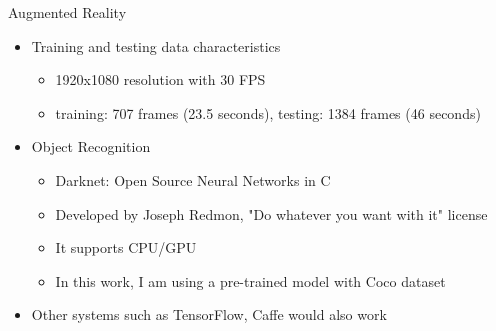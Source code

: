 \begin{frame}{Augmented Reality}
  \begin{itemize}
  \item Training and testing data characteristics
    \begin{itemize}
    \item 1920x1080 resolution with 30 FPS
    \item training: 707 frames (23.5 seconds), testing: 1384 frames (46 seconds)
    \end{itemize}
  \item Object Recognition
    \begin{itemize}
    \item Darknet: Open Source Neural Networks in C
    \item Developed by Joseph Redmon, "Do whatever you want with it" license
    \item It supports CPU/GPU
    \item In this work, I am using a pre-trained model with Coco dataset
    \end{itemize}
  \item Other systems such as TensorFlow, Caffe would also work
  \end{itemize}
\end{frame}


